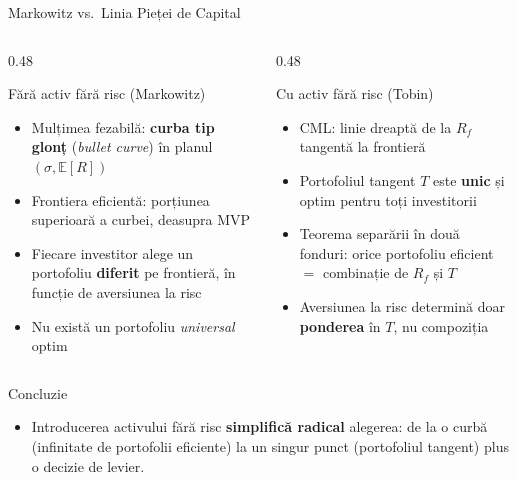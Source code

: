 \documentclass[9pt, aspectratio=169, t]{beamer}
\theoremstyle{definition}
\newcommand{\E}{\mathbb{E}}
\begin{document}
\begin{frame}{Markowitz vs.\ Linia Pieței de Capital}
\begin{columns}[T]
\begin{column}{0.48\textwidth}
\begin{block}{Fără activ fără risc (Markowitz)}
\begin{itemize}\setlength{\itemsep}{1pt}
    \item Mulțimea fezabilă: \textbf{curba tip glonț} (\textit{bullet curve}) în planul $(\sigma, \E[R])$
    \item Frontiera eficientă: porțiunea superioară a curbei, deasupra MVP
    \item Fiecare investitor alege un portofoliu \textbf{diferit} pe frontieră, în funcție de aversiunea la risc
    \item Nu există un portofoliu \textit{universal} optim
\end{itemize}
\end{block}
\end{column}
\begin{column}{0.48\textwidth}
\begin{exampleblock}{Cu activ fără risc (Tobin)}
\begin{itemize}\setlength{\itemsep}{1pt}
    \item CML: linie dreaptă de la $R_f$ tangentă la frontieră
    \item Portofoliul tangent $T$ este \textbf{unic} și optim pentru toți investitorii
    \item Teorema separării în două fonduri: orice portofoliu eficient $= $ combinație de $R_f$ și $T$
    \item Aversiunea la risc determină doar \textbf{ponderea} în $T$, nu compoziția
\end{itemize}
\end{exampleblock}
\end{column}
\end{columns}
\vspace{0.2cm}
\begin{alertblock}{Concluzie}
\begin{itemize}
\item \small Introducerea activului fără risc \textbf{simplifică radical} alegerea: de la o curbă (infinitate de portofolii eficiente) la un singur punct (portofoliul tangent) plus o decizie de levier.
\end{itemize}
\end{alertblock}
\end{frame}
\end{document}
